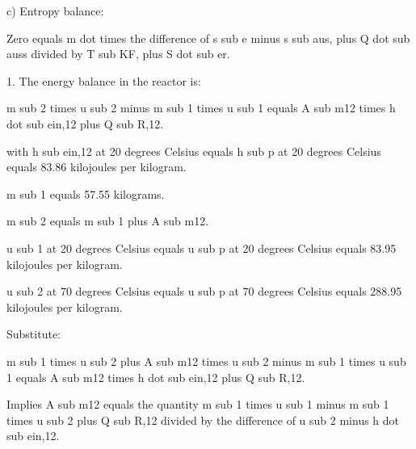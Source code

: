 c) Entropy balance:

Zero equals m dot times the difference of s sub e minus s sub aus, plus Q dot sub auss divided by T sub KF, plus S dot sub er.

1. The energy balance in the reactor is:

m sub 2 times u sub 2 minus m sub 1 times u sub 1 equals A sub m12 times h dot sub ein,12 plus Q sub R,12.

with h sub ein,12 at 20 degrees Celsius equals h sub p at 20 degrees Celsius equals 83.86 kilojoules per kilogram.

m sub 1 equals 57.55 kilograms.

m sub 2 equals m sub 1 plus A sub m12.

u sub 1 at 20 degrees Celsius equals u sub p at 20 degrees Celsius equals 83.95 kilojoules per kilogram.

u sub 2 at 70 degrees Celsius equals u sub p at 70 degrees Celsius equals 288.95 kilojoules per kilogram.

Substitute:

m sub 1 times u sub 2 plus A sub m12 times u sub 2 minus m sub 1 times u sub 1 equals A sub m12 times h dot sub ein,12 plus Q sub R,12.

Implies A sub m12 equals the quantity m sub 1 times u sub 1 minus m sub 1 times u sub 2 plus Q sub R,12 divided by the difference of u sub 2 minus h dot sub ein,12.